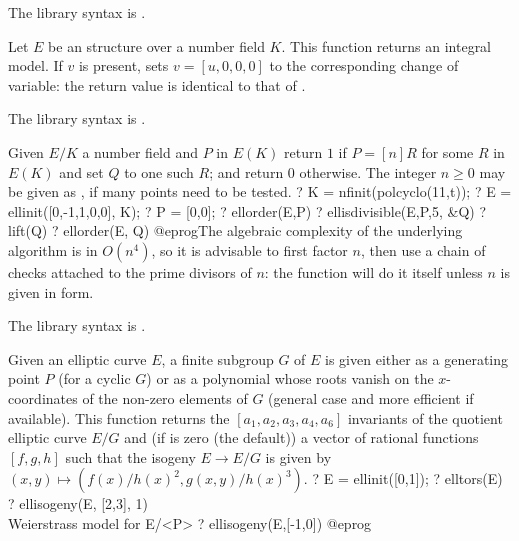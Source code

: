 The library syntax is .

\label{se:ellintegralmodel}
Let $E$ be an  structure over a number field $K$. This function
returns an integral model. If $v$ is present, sets $v = [u,0,0,0]$ to the
corresponding change of variable: the return value is identical to that of
.

The library syntax is .

\label{se:ellisdivisible}
Given $E/K$ a number field and $P$ in $E(K)$
return $1$ if $P = [n]R$ for some $R$ in $E(K)$ and set $Q$ to one such $R$;
and return $0$ otherwise. The integer $n \geq 0$ may be given as
, if many points need to be tested.
\bprog
? K = nfinit(polcyclo(11,t));
? E = ellinit([0,-1,1,0,0], K);
? P = [0,0];
? ellorder(E,P)
? ellisdivisible(E,P,5, &Q)
? lift(Q)
? ellorder(E, Q)
@eprog\noindent The algebraic complexity of the underlying algorithm is in
$O(n^4)$, so it is advisable to first factor $n$, then use a chain of checks
attached to the prime divisors of $n$: the function will do it itself unless
$n$ is given in  form.

The library syntax is .

\label{se:ellisogeny}
Given an elliptic curve $E$, a finite subgroup $G$ of $E$ is given either
as a generating point $P$ (for a cyclic $G$) or as a polynomial whose roots
vanish on the $x$-coordinates of the non-zero elements of $G$ (general case
and more efficient if available). This function returns the
$[a_1,a_2,a_3,a_4,a_6]$ invariants of the quotient elliptic curve $E/G$ and
(if  is zero (the default)) a vector of rational
functions $[f, g, h]$ such that the isogeny $E \to E/G$ is given by $(x,y)
\mapsto (f(x)/h(x)^2, g(x,y)/h(x)^3)$.
\bprog
? E = ellinit([0,1]);
? elltors(E)
? ellisogeny(E, [2,3], 1)  \\ Weierstrass model for E/<P>
? ellisogeny(E,[-1,0])
@eprog

